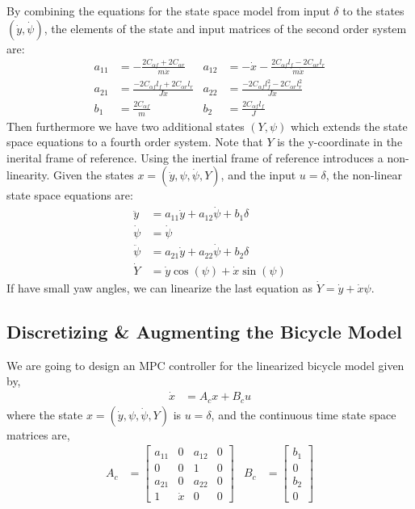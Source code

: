 \documentclass{article}
\begin{document}
By combining the equations for the state space model from input $\delta$ to the states $(\dot{y}, \dot{\psi})$, the
elements of the state and input matrices of the second order system are:
\begin{align}
    a_{11} &= -\frac{2C_{\alpha f} + 2C_{\alpha r}}{m\dot{x}} &
    a_{12} &= -\dot{x} - \frac{2C_{\alpha f}l_f - 2C_{\alpha r}l_r}{m\dot{x}} \\
    a_{21} &= \frac{-2C_{\alpha f}l_f + 2C_{\alpha r}l_r}{J\dot{x}} &
    a_{22} &= \frac{-2C_{\alpha f}l_f^2 - 2C_{\alpha r}l_r^2}{J\dot{x}} \\
    b_{1} &= \frac{2C_{\alpha f}}{m} &
    b_{2} &= \frac{2C_{\alpha f}l_f}{J}
\end{align}
Then furthermore we have two additional states $(Y, \psi)$ which extends the state space equations to a fourth order
system. Note that $Y$ is the y-coordinate in the inerital frame of reference. Using the inertial frame of reference
introduces a non-linearity. Given the states $x = (\dot{y}, \psi, \dot{\psi}, Y)$, and the input $u=\delta$, the
non-linear state space equations are:
\begin{align}
    \ddot{y} &= a_{11}\dot{y} + a_{12}\dot{\psi} + b_1\delta \\
    \dot{\psi} &= \dot{\psi} \\
    \ddot{\psi} &= a_{21}\dot{y} + a_{22}\dot{\psi} + b_2\delta \\
    \dot{Y} &= \dot{y}\cos(\psi) + \dot{x}\sin(\psi)
\end{align}
If have small yaw angles, we can linearize the last equation as $\dot{Y} = \dot{y} + \dot{x}\psi$.

\subsection{Discretizing \& Augmenting the Bicycle Model}
\label{sec:augmented-bicycle}

We are going to design an MPC controller for the linearized bicycle model given by,
\begin{align}
    \dot{x} &= A_cx + B_cu
\end{align}
where the state $x = (\dot{y}, \psi, \dot{\psi}, Y)$ is $u = \delta$, and the continuous time state space matrices are,
\begin{align}
    A_c &= \begin{bmatrix}
        a_{11} & 0 & a_{12} & 0 \\
        0 & 0 & 1 & 0 \\
        a_{21} & 0 & a_{22} & 0 \\
        1 & \dot{x} & 0 & 0
    \end{bmatrix} &
    B_c &= \begin{bmatrix}
        b_1 \\ 0 \\ b_2 \\ 0
    \end{bmatrix}
\end{align}
\end{document}
